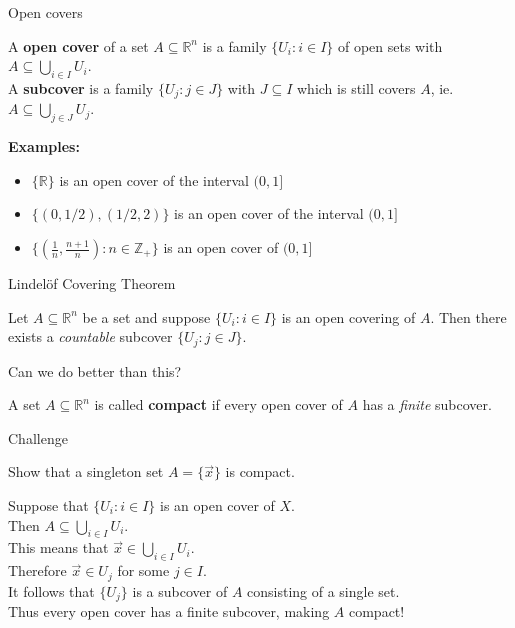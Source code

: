 \documentclass{beamer}
\begin{document}
\begin{frame}{Open covers}
\begin{defn}
A \textbf{open cover} of a set $A\subseteq\mathbb{R}^n$ is a family $\{U_i: i\in I\}$ of open sets with $A\subseteq \bigcup_{i\in I} U_i$.\\\pause
A \textbf{subcover} is a family $\{U_j: j\in J\}$ with $J\subseteq I$ which is still covers $A$, ie. $A\subseteq \bigcup_{j\in J} U_j$.
\end{defn}
\pause
\textbf{Examples:}
\begin{itemize}
\pause
\item $\{\mathbb{R}\}$ is an open cover of the interval $(0,1]$
\pause
\item $\{(0,1/2), (1/2, 2)\}$ is an open cover of the interval $(0,1]$
\pause
\item $\{(\frac{1}{n},\frac{n+1}{n}): n\in\mathbb{Z}_+\}$ is an open cover of $(0,1]$
\end{itemize}
\end{frame}

\begin{frame}{Lindel\"{o}f Covering Theorem}
\begin{thm}
Let $A\subseteq\mathbb{R}^n$ be a set and suppose $\{U_i: i\in I\}$ is an open covering of $A$.
Then there exists a \emph{countable} subcover $\{U_j: j\in J\}.$
\end{thm}
\pause
\begin{quest}
Can we do better than this?
\end{quest}
\pause
\begin{defn}
A set $A\subseteq\mathbb{R}^n$ is called \textbf{compact} if every open cover of $A$ has a \emph{finite} subcover.
\end{defn}
\end{frame}

\begin{frame}{Challenge}
\begin{prob}
Show that a singleton set $A=\{\vec x\}$ is compact.
\end{prob}
\pause
\begin{soln}
\pause
Suppose that $\{U_i: i\in I\}$ is an open cover of $X$.\\
\pause
Then $A\subseteq \bigcup_{i\in I} U_i$.\\
\pause
This means that $\vec x\in\bigcup_{i\in I} U_i$.\\
\pause
Therefore $\vec x\in U_j$ for some $j\in I$.\\
\pause
It follows that $\{U_j\}$ is a subcover of $A$ consisting of a single set.\\
\pause
Thus every open cover has a finite subcover, making $A$ compact!
\end{soln}
\end{frame}
\end{document}
